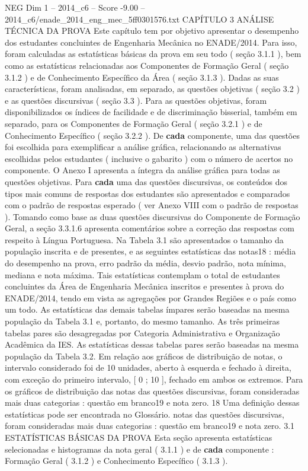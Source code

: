 \begin{textsample}{NEG Dim 1 – 2014\_c6 – Score -9.00 – 2014\_c6/enade\_2014\_eng\_mec\_5ff0301576.txt}  \label{ex:f1_neg_012}
CAPÍTULO 3 ANÁLISE TÉCNICA DA PROVA Este capítulo tem por objetivo apresentar o desempenho dos estudantes concluintes de Engenharia Mecânica no ENADE/2014.
Para isso, foram calculadas as estatísticas básicas da prova em seu todo ( seção 3.1.1 ), bem como as estatísticas relacionadas aos Componentes de Formação Geral ( seção 3.1.2 ) e de Conhecimento Específico da Área ( seção 3.1.3 ).
Dadas as suas características, foram analisadas, em separado, as questões objetivas ( seção 3.2 ) e as questões discursivas ( seção 3.3 ).
Para as questões objetivas, foram disponibilizados os índices de facilidade e de discriminação bisserial, também em separado, para os Componentes de Formação Geral ( seção 3.2.1 ) e de Conhecimento Específico ( seção 3.2.2 ).
De \textbf{cada} componente, uma das questões foi escolhida para exemplificar a análise gráfica, relacionando as alternativas escolhidas pelos estudantes ( inclusive o gabarito ) com o número de acertos no componente.
O Anexo I apresenta a íntegra da análise gráfica para todas as questões objetivas.
Para \textbf{cada} uma das questões discursivas, os conteúdos dos tipos mais comuns de respostas dos estudantes são apresentados e comparados com o padrão de respostas esperado ( ver Anexo VIII com o padrão de respostas ).
Tomando como base as duas questões discursivas do Componente de Formação Geral, a seção 3.3.1.6 apresenta comentários sobre a correção das respostas com respeito à Língua Portuguesa.
Na Tabela 3.1 são apresentados o tamanho da população inscrita e de presentes, e as seguintes estatísticas das notas18 : média do desempenho na prova, erro padrão da média, desvio padrão, nota mínima, mediana e nota máxima.
Tais estatísticas contemplam o total de estudantes concluintes da Área de Engenharia Mecânica inscritos e presentes à prova do ENADE/2014, tendo em vista as agregações por Grandes Regiões e o país como um todo.
As estatísticas das demais tabelas ímpares serão baseadas na mesma população da Tabela 3.1 e, portanto, do mesmo tamanho.
As três primeiras tabelas pares são desagregadas por Categoria Administrativa e Organização Acadêmica da IES.
As estatísticas dessas tabelas pares serão baseadas na mesma população da Tabela 3.2.
Em relação aos gráficos de distribuição de notas, o intervalo considerado foi de 10 unidades, aberto à esquerda e fechado à direita, com exceção do primeiro intervalo, [ 0 ; 10 ], fechado em ambos os extremos.
Para os gráficos de distribuição das notas das questões discursivas, foram consideradas mais duas categorias : questão em branco19 e nota zero. 18 Uma definição dessas estatísticas pode ser encontrada no Glossário. notas das questões discursivas, foram consideradas mais duas categorias : questão em branco19 e nota zero. 3.1 ESTATÍSTICAS BÁSICAS DA PROVA Esta seção apresenta estatísticas selecionadas e histogramas da nota geral ( 3.1.1 ) e de \textbf{cada} componente : Formação Geral ( 3.1.2 ) e Conhecimento Específico ( 3.1.3 ).

\end{textsample}
